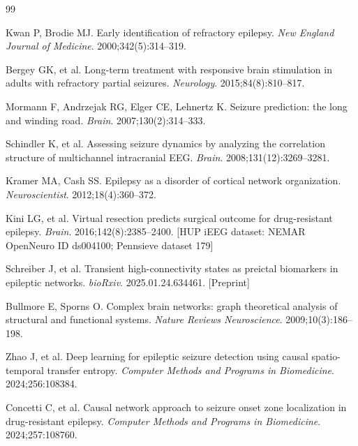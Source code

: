 \documentclass[final,5p,times,twocolumn]{elsarticle}
\begin{document}


\begin{thebibliography}{99}

  Kwan P, Brodie MJ.
  Early identification of refractory epilepsy.
  \textit{New England Journal of Medicine}. 2000;342(5):314--319.

  Bergey GK, et al.
  Long-term treatment with responsive brain stimulation in adults with
  refractory partial seizures.
  \textit{Neurology}. 2015;84(8):810--817.

  Mormann F, Andrzejak RG, Elger CE, Lehnertz K.
  Seizure prediction: the long and winding road.
  \textit{Brain}. 2007;130(2):314--333.

  Schindler K, et al.
  Assessing seizure dynamics by analyzing the correlation structure of
  multichannel intracranial EEG.
  \textit{Brain}. 2008;131(12):3269--3281.

  Kramer MA, Cash SS.
  Epilepsy as a disorder of cortical network organization.
  \textit{Neuroscientist}. 2012;18(4):360--372.

  Kini LG, et al.
  Virtual resection predicts surgical outcome for drug-resistant
  epilepsy.
  \textit{Brain}. 2016;142(8):2385--2400.
  [HUP iEEG dataset: NEMAR OpenNeuro ID ds004100; Pennsieve dataset 179]

  Schreiber J, et al.
  Transient high-connectivity states as preictal biomarkers in epileptic
  networks.
  \textit{bioRxiv}. 2025.01.24.634461. [Preprint]

  Bullmore E, Sporns O.
  Complex brain networks: graph theoretical analysis of structural and
  functional systems.
  \textit{Nature Reviews Neuroscience}. 2009;10(3):186--198.

  Zhao J, et al.
  Deep learning for epileptic seizure detection using causal
  spatio-temporal transfer entropy.
  \textit{Computer Methods and Programs in Biomedicine}.
  2024;256:108384.

  Concetti C, et al.
  Causal network approach to seizure onset zone localization in
  drug-resistant epilepsy.
  \textit{Computer Methods and Programs in Biomedicine}.
  2024;257:108760.


\end{thebibliography}
\end{document}
